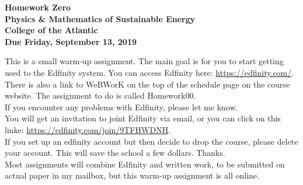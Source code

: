\documentclass[12pt]{article}
\begin{document}
\pagestyle{empty}
 
\begin{center}
{\Large {\bf Homework Zero}}\\
\smallskip
{\large {\bf Physics \& Mathematics of Sustainable Energy}}\\
\smallskip
{\large {\bf College of the Atlantic}}\\
\smallskip
{ {\bf Due Friday, September 13, 2019}}\\
\end{center}

\medskip
\noindent This is a small warm-up assignment.  The main goal is for
you to start getting used to the Edfinity system.  You can access
Edfinity here: \url{https://edfinity.com/}.
There is also a link to WeBWorK on the top of the schedule page on the 
course website.  The assignment to do is called Homework00.\\

\noindent If you encounter any problems with Edfinity, please let me
know. \\

\noindent You will get an invitation to joint Edfinity via email, or
you can click on this linke:
\url{https://edfinity.com/join/9TFHWDNH}.\\  

\noindent If you set up an edfinity account but then decide to drop
the course, please delete your account.  This will save the school
a few dollars.  Thanks. \\

\noindent Most assignments will combine Edfinity and written work, to
be submitted on actual paper in my mailbox, but this warm-up
assignment is all online.  
\end{document}
